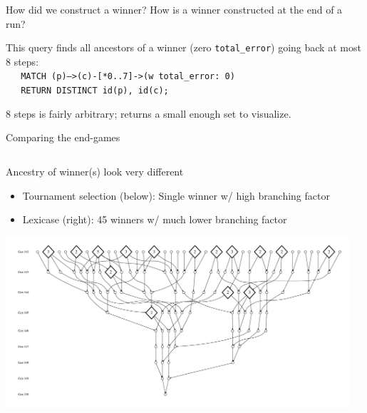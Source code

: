 \documentclass{beamer}
\newcommand{\linespace}{\vskip 0.25cm}
\begin{document}
\begin{frame}{How did we construct a winner?}
	How is a winner constructed at the end of a run?
	
	\linespace
	
	This query finds all ancestors of a winner (zero \texttt{total\_error}) going back at most 8 steps:\\
	\texttt{$\quad$ MATCH (p)-->(c)-[*0..7]->(w {total\_error: 0}) \\
$\quad$ RETURN DISTINCT id(p), id(c);}

	\linespace
	
	8 steps is fairly arbitrary; returns a small enough set to visualize.
\end{frame}

\begin{frame}{Comparing the end-games}
	\begin{columns}
		\begin{column}{0.5 \linewidth}
			Ancestry of winner(s) look very different
			\begin{itemize}
				\item Tournament selection (below): Single winner w/ high branching factor
				\item Lexicase (right): 45 winners w/ much lower branching factor
			\end{itemize}
			\begin{center}
				\includegraphics[width=\linewidth]{Figures/ancestors_of_winner_rswn_tourney_run74_9gens}
			\end{center}
		\end{column}
		\begin{column}{0.5 \linewidth}
			\begin{center}

\end{center}
\end{column}
\end{columns}
\end{frame}
\end{document}
